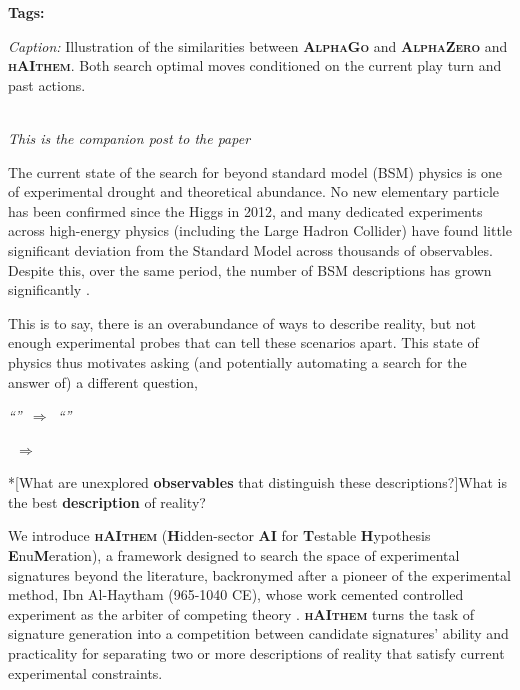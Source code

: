 \documentclass[11pt]{article}
\makeatletter
\newcommand{\haithem}{\textbf{\textsc{hAIthem}}}
\newcommand{\alphago}{\textbf{\textsc{AlphaGo}}}
\newcommand{\alphazero}{\textbf{\textsc{AlphaZero}}}
\newcommand{\interactive}[3][]{%
  \begin{tcolorbox}[colback=orange!5,colframe=orange!60!black,
                    title={Interactive: \texttt{#2}\ifx\relax#1\relax\else\ (#1)\fi}]
  \emph{Caption:} #3
  \end{tcolorbox}}
\newcommand{\pullquote}{\@ifstar\pq@bare\pq@quoted}
\newcommand{\pq@quoted}[2][]{%
  \begin{center}\itshape\large
  ``#2''\ifx\relax#1\relax\else\ $\Rightarrow$\ ``#1''\fi
  \end{center}}
\newcommand{\pq@bare}[2][]{%
  \begin{center}\itshape\large
  #2\ifx\relax#1\relax\else\ $\Rightarrow$\ #1\fi
  \end{center}}
\makeatother
\begin{document}
\maketitle
\noindent\textbf{Tags:} \theposttags

\interactive{alphazero}{Illustration of the similarities between \alphago{}
and \alphazero{} and \haithem{}. Both search optimal moves conditioned on
the current play turn and past actions.}

\noindent\textit{\thepostbyline}\\
\textit{This is the companion post to the paper
\href{https://arxiv.org/abs/2609.38309}{\thepapertitle}}\par\medskip


The current state of the search for beyond standard model (BSM) physics is one of experimental drought and theoretical abundance. No new elementary particle has been confirmed since the Higgs in 2012, and many dedicated experiments across high-energy physics (including the Large Hadron Collider) have found little significant deviation from the Standard Model across thousands of observables. Despite this, over the same period, the number of BSM descriptions has grown significantly \cite{Bertone:2018krk}. 

This is to say, there is an overabundance of ways to describe reality, but not enough experimental probes that can tell these scenarios apart. This state of physics thus motivates asking (and potentially automating a search for the answer of) a different question,  


\pullquote*[What are unexplored \textbf{observables} that distinguish these descriptions?]{What is the best \textbf{description} of
reality?}


We introduce \haithem{} (\textbf{H}idden-sector \textbf{AI} for \textbf{T}estable \textbf{H}ypothesis \textbf{E}nu\textbf{M}eration), a framework designed to search the space of experimental signatures beyond the literature, backronymed after a pioneer of the experimental method, Ibn Al-Haytham (965-1040 CE), whose work cemented controlled experiment as the arbiter of competing theory \cite{Sabra:1989optics,Ibn-al-haythem-reflect}. \haithem{} turns the task of signature generation into a competition between candidate signatures' ability and practicality for separating two or more descriptions of reality that satisfy current experimental constraints.
\end{document}
